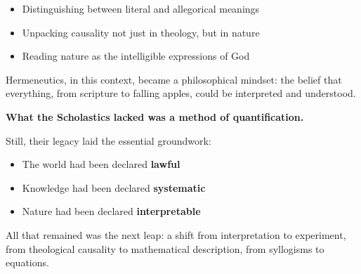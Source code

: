 \begin{itemize}
    \item Distinguishing between literal and allegorical meanings
    \item Unpacking causality not just in theology, but in nature
    \item Reading nature as the intelligible expressions of God
\end{itemize}

Hermeneutics, in this context, became a philosophical mindset: the belief that everything, from scripture to falling apples, could be interpreted and understood.

\textbf{What the Scholastics lacked was a method of quantification.}

Still, their legacy laid the essential groundwork:

\begin{itemize}
    \item The world had been declared \textbf{lawful}
    \item Knowledge had been declared \textbf{systematic}
    \item Nature had been declared \textbf{interpretable}
\end{itemize}

All that remained was the next leap: a shift from interpretation to experiment, from theological causality to mathematical description, from syllogisms to equations.


